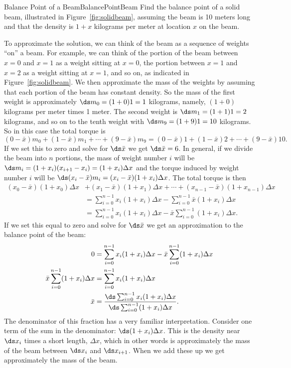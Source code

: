 \begin{example}{Balance Point of a Beam}{BalancePointBeam}
Find the balance point of a solid beam, illustrated in Figure~\ref{fig:solidbeam},
assuming the beam is 10 meters long and that the density is $1+x$ kilograms
per meter at location $x$ on the beam.
\end{example}
\begin{solution}
To approximate the solution, we can think of the beam as a sequence of weights ``on''
a beam. For example, we can think of the portion of the beam between
$x=0$ and $x=1$ as a weight sitting at $x=0$, the portion between
$x=1$ and $x=2$ as a weight sitting at $x=1$, and so on, as indicated
in Figure~\ref{fig:solidbeam}. We then
approximate the mass of the weights by assuming that each portion of
the beam has constant density. So the mass of the first weight is
approximately $\ds m_0=(1+0)1=1$ kilograms, namely, $(1+0)$
kilograms per meter times 1 meter. The second weight is $\ds
m_1=(1+1)1=2$ kilograms, and so on to the tenth weight with $\ds
m_9=(1+9)1=10$ kilograms.  So in this case the total torque is
\[(0-\bar x)m_0+(1-\bar x)m_1+\cdots+(9-\bar x)m_9=
  (0-\bar x)1+(1-\bar x)2+\cdots+(9-\bar x)10.\]
If we set this to zero and solve for $\ds \bar x$ we get $\ds \bar x=6$.
In general, if we divide the beam into $n$ portions, the mass
of weight number $i$ will be $\ds m_i=(1+x_i)(x_{i+1}-x_i)=(1+x_i)\Delta x$ 
and the torque induced by weight number $i$ will be
$\ds (x_i-\bar x)m_i=(x_i-\bar x)(1+x_i)\Delta x$. The total torque is then
\begin{align*}
(x_0-\bar x)(1+x_0)\Delta x&+(x_1-\bar x)(1+x_1)\Delta x+\cdots+(x_{n-1}-\bar x)(1+x_{n-1})\Delta x	\\
  &=\sum_{i=0}^{n-1} x_i(1+x_i)\Delta x-\sum_{i=0}^{n-1}\bar x(1+x_i)\Delta x	\\
  &=\sum_{i=0}^{n-1} x_i(1+x_i)\Delta x-\bar x\sum_{i=0}^{n-1}(1+x_i)\Delta x.
\end{align*}
If we set this equal to zero and solve for $\ds \bar x$ we get an
approximation to the balance point of the beam:
\begin{align*}
  0&=\sum_{i=0}^{n-1} x_i(1+x_i)\Delta x- 
    \bar x\sum_{i=0}^{n-1}(1+x_i)\Delta x	\\
  \bar x\sum_{i=0}^{n-1}(1+x_i)\Delta x&=\sum_{i=0}^{n-1} x_i(1+x_i)\Delta x	\\
  \bar x&={\ds\sum_{i=0}^{n-1} x_i(1+x_i)\Delta x\over
     \ds\sum_{i=0}^{n-1}(1+x_i)\Delta x}.
\end{align*}
The denominator of this fraction has a very familiar
interpretation. Consider one term of the sum in the denominator: $\ds
(1+x_i)\Delta x$. This is the density near $\ds x_i$ times a short
length, $\Delta x$, which in other words is approximately the mass of
the beam between $\ds x_i$ and $\ds x_{i+1}$. When we add these up we
get approximately the mass of the beam.


\end{solution}
